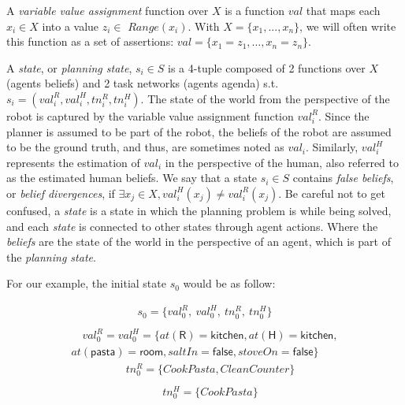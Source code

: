 A \textit{variable value assignment} function over $X$ is a function $val$ that maps each $x_i \in X$ into a value $z_i \in$ $\textit{Range}(x_i)$. With $X = \{ x_1, ..., x_n \}$, we will often write this function as a set of assertions: $val = \{ x_1=z_1, \ldots, x_n=z_n \}$. 


A \textit{state}, or \textit{planning state}, $s_i \in S$ is a 4-tuple composed of 2 functions over $X$ (agents beliefs) and 2 task networks (agents agenda)  s.t. $s_i = (val^R_i, val^H_i, tn^R_i, tn^H_i)$. 
The state of the world from the perspective of the robot is captured by the variable value assignment function $val^R_i$. Since the planner is assumed to be part of the robot, the beliefs of the robot are assumed to be the ground truth, and thus, are sometimes noted as $val_i$. 
Similarly, $val^H_i$ represents the estimation of $val_i$ in the perspective of the human, also referred to as the estimated human beliefs. 
We say that a state $s_i \in S$ contains \textit{false beliefs}, or \textit{belief divergences}, if $\exists x_j \in X, val^H_i(x_j) \neq val^R_i(x_j)$. 
Be careful not to get confused, a \textit{state} is a state in which the planning problem is while being solved, and each \textit{state} is connected to other states through agent actions. Where the \textit{beliefs} are the state of the world in the perspective of an agent, which is part of the \textit{planning state}.

For our example, the initial state $s_0$ would be as follow: 

{\small
\noindent
\begin{multline*}
s_0 = \{val^R_0, ~val^H_0, ~tn^R_0, ~tn^H_0\} \\ \quad
\end{multline*}
\bigvspace
\begin{multline*}
\quad val^R_0 = val^H_0 = \{at(\textsf{R}) = \textsf{kitchen}, at(\textsf{H}) = \textsf{kitchen},\\ 
at(\textsf{pasta}) = \textsf{room}, saltIn = \textsf{false}, stoveOn=\textsf{false} \}
\end{multline*}
\smallvspace
\begin{multline*}
\quad tn^R_0 = \{ CookPasta, CleanCounter \} \\ \quad
\end{multline*}
\bigvspace
\begin{multline*}
\quad tn^H_0 = \{ CookPasta \} \\ \quad
\end{multline*}
\smallvspace
}

